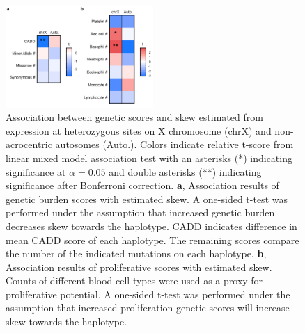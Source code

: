 \begin{figure}[ht]
    \centering
    \includegraphics[width=0.5\textwidth]{chapter4/Figures/Figure_2.png}
    \caption{
        Association between genetic scores and skew estimated from expression at heterozygous sites on X chromosome (chrX) and non-acrocentric autosomes (Auto.). Colors indicate relative t-score from linear mixed model association test with an asterisks (*) indicating significance at $\alpha=0.05$ and double asterisks (**) indicating significance after Bonferroni correction.
        \textbf{a}, Association results of genetic burden scores with estimated skew. A one-sided t-test was performed under the assumption that increased genetic burden decreases skew towards the haplotype. CADD indicates difference in mean CADD score of each haplotype. The remaining scores compare the number of the indicated mutations on each haplotype.
        \textbf{b}, Association results of proliferative scores with estimated skew. Counts of different blood cell types were used as a proxy for proliferative potential. A one-sided t-test was performed under the assumption that increased proliferation genetic scores will increase skew towards the haplotype.}
    \label{fig:fig4.2}
\end{figure}